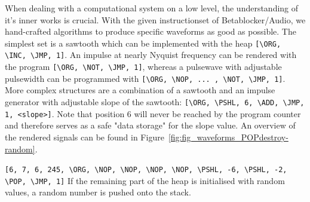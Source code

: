 \documentclass[letterpaper, 12pt]{article}
\begin{document}
When dealing with a computational system on a low level, the understanding of it's inner works is crucial.
With the given instructionset of Betablocker/Audio, we hand-crafted algorithms to produce specific waveforms as good as possible.
The simplest set is a sawtooth which can be implemented with the heap \verb#[\ORG, \INC, \JMP, 1]#.
An impulse at nearly Nyquist frequency can be rendered with the program \verb#[\ORG, \NOT, \JMP, 1]#, whereas a pulsewave with adjustable pulsewidth can be programmed with \verb#[\ORG, \NOP, ... , \NOT, \JMP, 1]#.
More complex structures are a combination of a sawtooth and an impulse generator with adjustable slope of the sawtooth: \verb#[\ORG, \PSHL, 6, \ADD, \JMP, 1, <slope>]#. Note that position 6 will never be reached by the program counter and therefore serves as a safe "data storage" for the slope value.
An overview of the rendered signals can be found in Figure~\ref{fig:fig_waveforms_POPdestroy-random}.

\verb#[6, 7, 6, 245, \ORG, \NOP, \NOP, \NOP, \NOP, \PSHL, -6, \PSHL, -2, \POP, \JMP, 1]#
If the remaining part of the heap is initialised with random values, a random number is pushed onto the stack.
\end{document}
